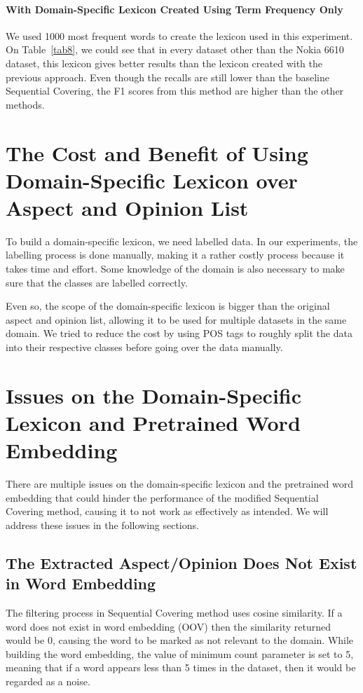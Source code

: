 \documentclass[a4paper,conference]{IEEEtran}
\begin{document}
\paragraph{With Domain-Specific Lexicon Created Using Term Frequency Only}
We used 1000 most frequent words to create the lexicon used in this experiment. On Table~\ref{tab8}, we could see that in every dataset other than the Nokia 6610 dataset, this lexicon gives better results than the lexicon created with the previous approach. Even though the recalls are still lower than the baseline Sequential Covering, the F1 scores from this method are higher than the other methods.

\section{The Cost and Benefit of Using Domain-Specific Lexicon over Aspect and Opinion List}
To build a domain-specific lexicon, we need labelled data. In our experiments, the labelling process is done manually, making it a rather costly process because it takes time and effort. Some knowledge of the domain is also necessary to make sure that the classes are labelled correctly.

Even so, the scope of the domain-specific lexicon is bigger than the original aspect and opinion list, allowing it to be used for multiple datasets in the same domain. We tried to reduce the cost by using POS tags to roughly split the data into their respective classes before going over the data manually.

\section{Issues on the Domain-Specific Lexicon and Pretrained Word Embedding}
There are multiple issues on the domain-specific lexicon and the pretrained word embedding that could hinder the performance of the modified Sequential Covering method, causing it to not work as effectively as intended. We will address these issues in the following sections.

\subsection{The Extracted Aspect/Opinion Does Not Exist in Word Embedding}
The filtering process in Sequential Covering method uses cosine similarity. If a word does not exist in word embedding (OOV) then the similarity returned would be 0, causing the word to be marked as not relevant to the domain. While building the word embedding, the value of minimum count parameter is set to 5, meaning that if a word appears less than 5 times in the dataset, then it would be regarded as a noise.
\end{document}
